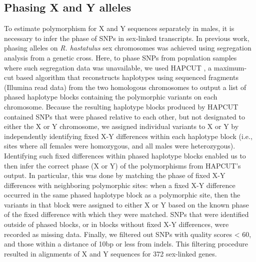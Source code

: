 \documentclass[9pt,twocolumn,twoside,lineno]{gsajnl}
\begin{document}
\subsection*{Phasing X and Y alleles}
To estimate polymorphism for X and Y sequences separately in males, it is necessary to infer the phase of SNPs in sex-linked transcripts. In previous work, phasing alleles on \textit{R. hastatulus} sex chromosomes was achieved using segregation analysis from a genetic cross. Here, to phase SNPs from population samples where such segregation data was unavailable, we used HAPCUT \citep{bansal2008hapcut}, a maximum-cut based algorithm that reconstructs haplotypes using sequenced fragments (Illumina read data) from the two homologous chromosomes to output a list of phased haplotype blocks containing the polymorphic variants on each chromosome. Because the resulting haplotype blocks produced by HAPCUT contained SNPs that were phased relative to each other, but not designated to either the X or Y chromosome, we assigned individual variants to X or Y by independently identifying fixed X-Y differences within each haplotype block (i.e., sites where all females were homozygous, and all males were heterozygous). Identifying such fixed differences within phased haplotype blocks enabled us to then infer the correct phase (X or Y) of the polymorphisms from HAPCUT’s output. In particular, this was done by matching the phase of fixed X-Y differences with neighboring polymorphic sites: when a fixed X-Y difference occurred in the same phased haplotype block as a polymorphic site, then the variants in that block were assigned to either X or Y based on the known phase of the fixed difference with which they were matched. SNPs that were identified outside of phased blocks, or in blocks without fixed X-Y differences, were recorded as missing data. Finally, we filtered out SNPs with quality scores < 60, and those within a distance of 10bp or less from indels. This filtering procedure resulted in alignments of X and Y sequences for 372 sex-linked genes.
\end{document}
